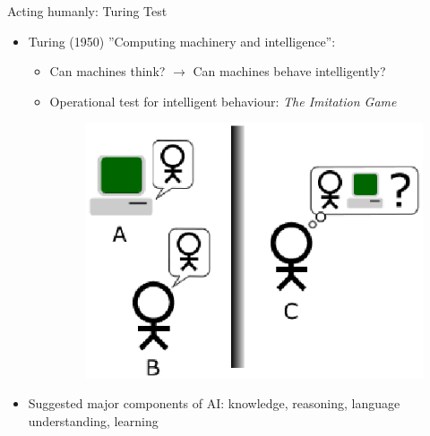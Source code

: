 \documentclass[%
pdf,
colorBG,
slideColor,
tcrico,
]{prosper}
\begin{document}
\begin{slide}{Acting humanly: Turing Test}
\begin{itemize}
 \item  Turing (1950) ''Computing machinery and intelligence'':
	\begin{itemize}
	\item Can machines think? $\xrightarrow{}$ Can machines behave intelligently?
	\item Operational test for intelligent behaviour: \textit{The Imitation Game}
	\begin{figure}
	\centering
	\includegraphics[scale=0.3]{Turing_Test_version_4.eps}
	\end{figure}
	\end{itemize}
\item Suggested major components of AI: knowledge, reasoning, language understanding, learning
\end{itemize}
\end{slide}

\end{document}
